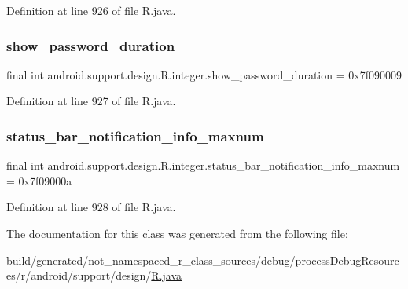 Definition at line 926 of file R.\+java.

\mbox{\label{classandroid_1_1support_1_1design_1_1_r_1_1integer_a10ce8bfe10cb0e779af49220383e052c}} 
\subsubsection{\texorpdfstring{show\_password\_duration}{show\_password\_duration}}
{\footnotesize\ttfamily final int android.\+support.\+design.\+R.\+integer.\+show\+\_\+password\+\_\+duration = 0x7f090009\hspace{0.3cm}{\ttfamily [static]}}



Definition at line 927 of file R.\+java.

\mbox{\label{classandroid_1_1support_1_1design_1_1_r_1_1integer_a4b128748dfc77dbedbe2c85115af5a64}} 
\subsubsection{\texorpdfstring{status\_bar\_notification\_info\_maxnum}{status\_bar\_notification\_info\_maxnum}}
{\footnotesize\ttfamily final int android.\+support.\+design.\+R.\+integer.\+status\+\_\+bar\+\_\+notification\+\_\+info\+\_\+maxnum = 0x7f09000a\hspace{0.3cm}{\ttfamily [static]}}



Definition at line 928 of file R.\+java.



The documentation for this class was generated from the following file\+:\begin{DoxyCompactItemize}
\item 
build/generated/not\+\_\+namespaced\+\_\+r\+\_\+class\+\_\+sources/debug/process\+Debug\+Resources/r/android/support/design/\mbox{\hyperlink{android_2support_2design_2_r_8java}{R.\+java}}\end{DoxyCompactItemize}
